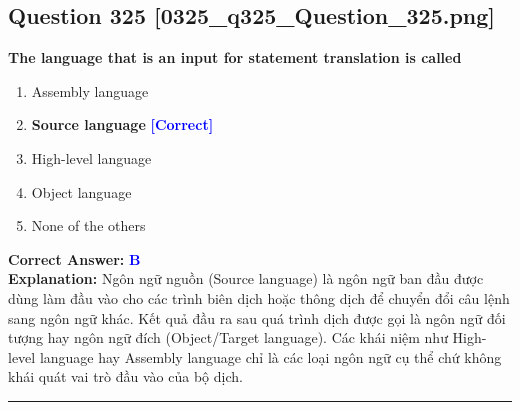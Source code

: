 \documentclass[11pt,a4paper]{article}
\begin{document}
\begin{minipage}{\textwidth}
\subsection*{Question 325 \quad \footnotesize{[0325\_q325\_Question\_325.png]}}
\noindent \textbf{The language that is an input for statement translation is called}

\begin{enumerate}[label=\Alph*.]
    \item Assembly language
    \item \textbf{Source language} \hfill \textcolor{blue}{\textbf{[Correct]}}
    \item High-level language
    \item Object language
    \item None of the others
\end{enumerate}

\noindent \textbf{Correct Answer:} \textcolor{blue}{\textbf{B}} \\[2pt]
\noindent \textbf{Explanation:} Ngôn ngữ nguồn (Source language) là ngôn ngữ ban đầu được dùng làm đầu vào cho các trình biên dịch hoặc thông dịch để chuyển đổi câu lệnh sang ngôn ngữ khác. Kết quả đầu ra sau quá trình dịch được gọi là ngôn ngữ đối tượng hay ngôn ngữ đích (Object/Target language). Các khái niệm như High-level language hay Assembly language chỉ là các loại ngôn ngữ cụ thể chứ không khái quát vai trò đầu vào của bộ dịch.

\par\vspace{0.3cm}
\hrule
\vspace{0.3cm}
\end{minipage}
\end{document}
